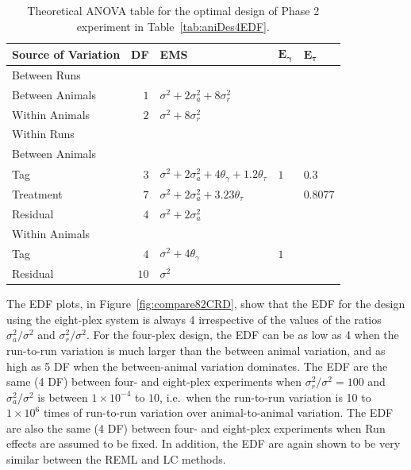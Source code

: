 \begin{table}[!ht]
 \caption{Theoretical ANOVA table for the optimal design of Phase 2 experiment in Table~\ref{tab:aniDes4EDF}.}
 \begin{tabular}[t]{lrlll} 
 \toprule 
 \multicolumn{1}{l}{\textbf{Source of Variation}} & \multicolumn{1}{l}{\textbf{DF}} & \multicolumn{1}{l}{\textbf{EMS}}& \multicolumn{1}{l}{$\bm{E_{\gamma}}$}&\multicolumn{1}{l}{$\bm{E_{\tau}}$}\\ 
 \midrule 
 Between Runs &  &  & & \\ 
 \quad Between Animals & $1$ & $\sigma^2+2\sigma_{a}^2+8\sigma_{r}^2$ & & \\ 
 \quad Within Animals & $2$ & $\sigma^2+8\sigma_{r}^2$ & & \\ \hline 
 Within Runs &  &  & & \\ 
 \quad Between Animals &  &  & & \\ 
 \quad \quad Tag & $3$ & $\sigma^2+2\sigma_{a}^2+4\theta_{\gamma}+1.2\theta_{\tau}$ &$1$ &  $0.3$\\ 
 \quad \quad Treatment & $7$ & $\sigma^2+2\sigma_{a}^2+3.23\theta_{\tau}$ & & $0.8077$\\ 
 \quad \quad Residual & $4$ & $\sigma^2+2\sigma_{a}^2$ & & \\ \hline 
 \quad Within Animals &  &  & & \\ 
 \quad \quad Tag & $4$ & $\sigma^2+4\theta_{\gamma}$ &$1$ & \\ 
 \quad \quad Residual & $10$ & $\sigma^2$ & & \\ 
 \bottomrule 
 \end{tabular} 
 \label{tab:ANOVAPhaseCRD32} 
\end{table} 

The EDF plots, in Figure~\ref{fig:compare82CRD}, show that the EDF for the design using the eight-plex system is always 4 irrespective of the values of the ratios $\sigma_a^2/\sigma^2$ and $\sigma_r^2/\sigma^2$. For the four-plex design, the EDF can be as low as 4 when the run-to-run variation is much larger than the between animal variation, and as high as 5 DF when the between-animal variation dominates. The EDF are the same (4 DF) between four- and eight-plex experiments when $\sigma_r^2/\sigma^2 = 100$ and $\sigma_a^2/\sigma^2$ is between $1 \times 10^{-4}$ to $10$, i.e.\ when the run-to-run  variation is 10 to $1 \times 10^{6}$ times of run-to-run variation over animal-to-animal variation. The EDF are also the same (4 DF) between four- and eight-plex experiments when Run effects are assumed to be fixed. In addition, the EDF are again shown to be very similar between the REML and LC methods.

